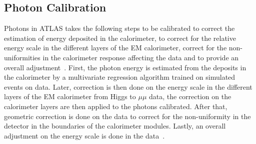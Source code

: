 %
%


\subsection{Photon Calibration}
Photons in ATLAS takes the following steps to be calibrated to correct the estimation of energy deposited in the calorimeter, to correct for the relative energy scale in the different layers of the EM calorimeter, correct for the non-uniformities in the calorimeter response affecting the data and to provide an overall adjustment~\cite{gammaCalibration2019}.
First, the photon energy is estimated from the deposits in the calorimeter by a multivariate regression algorithm trained on simulated events on data. Later, correction is then done on the energy scale in the different layers of the EM calorimeter from Higgs to $\mu \mu$ data, the correction on the calorimeter layers are then applied to the photons calibrated. After that, geometric correction is done on the data to correct for the non-uniformity in the detector in the boundaries of the calorimeter modules. Lastly, an overall adjustment on the energy scale is done in the data~\cite{gammaCalibration2019}.

